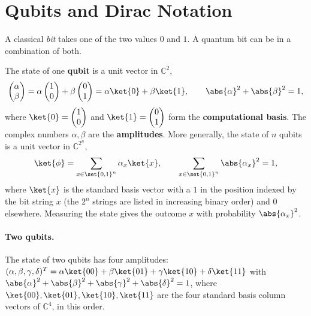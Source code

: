 
\section{Qubits and Dirac Notation}

A classical \emph{bit} takes one of the two values $0$ and $1$. A quantum bit can be in a combination
of both.

\begin{definition}\label{def:qubit-0915}
    The state of one \textbf{qubit} is a unit vector in $\mathbb{C}^2$,
    \[\begin{pmatrix} \alpha \\ \beta \end{pmatrix}
        = \alpha \begin{pmatrix} 1 \\ 0 \end{pmatrix} + \beta \begin{pmatrix} 0 \\ 1 \end{pmatrix}
        = \alpha \ket{0} + \beta \ket{1},
        \qquad \abs{\alpha}^2 + \abs{\beta}^2 = 1,\]
    where $\ket{0} = \begin{pmatrix} 1 \\ 0 \end{pmatrix}$ and
    $\ket{1} = \begin{pmatrix} 0 \\ 1 \end{pmatrix}$ form the \textbf{computational basis}. The
    complex numbers $\alpha, \beta$ are the \textbf{amplitudes}. More generally, the state of $n$
    qubits is a unit vector in $\mathbb{C}^{2^n}$,
    \[\ket{\phi} = \sum_{x \in \set{0,1}^n} \alpha_x \ket{x},
        \qquad \sum_{x \in \set{0,1}^n} \abs{\alpha_x}^2 = 1,\]
    where $\ket{x}$ is the standard basis vector with a $1$ in the position indexed by the bit string
    $x$ (the $2^n$ strings are listed in increasing binary order) and $0$ elsewhere. Measuring the
    state gives the outcome $x$ with probability $\abs{\alpha_x}^2$.
\end{definition}

\paragraph{Two qubits.} The state of two qubits has four amplitudes:
$(\alpha, \beta, \gamma, \delta)^T = \alpha \ket{00} + \beta \ket{01} + \gamma \ket{10} + \delta \ket{11}$
with $\abs{\alpha}^2 + \abs{\beta}^2 + \abs{\gamma}^2 + \abs{\delta}^2 = 1$, where
$\ket{00}, \ket{01}, \ket{10}, \ket{11}$ are the four standard basis column vectors of
$\mathbb{C}^4$, in this order.

